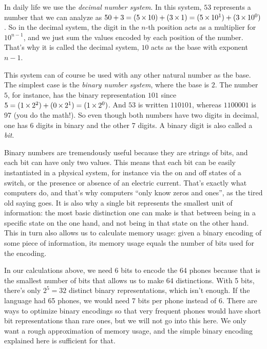 \begin{techinfo}
    In daily life we use the \emph{decimal number system}.
    In this system, $53$ represents a number that we can analyze as $50 + 3 = (5 \mathop{\times} 10) + (3 \mathop{\times} 1) = (5 \mathop{\times} 10^1) + (3 \mathop{\times} 10^0)$.
    So in the decimal system, the digit in the $n$-th position acts as a multiplier for $10^{n-1}$, and we just sum the values encoded by each position of the number.
    That's why it is called the decimal system, $10$ acts as the base with exponent $n-1$.

    This system can of course be used with any other natural number as the base.
    The simplest case is the \emph{binary number system}, where the base is $2$.
    The number $5$, for instance, has the binary representation $101$ since $5 = (1 \mathop{\times} 2^2) + (0 \mathop{\times} 2^1) = (1 \mathop{\times} 2^0)$.
    And $53$ is written $110101$, whereas $1100001$ is 97 (you do the math!).
    So even though both numbers have two digits in decimal, one has 6 digits in binary and the other 7 digits.
    A binary digit is also called a \emph{bit}.

    Binary numbers are tremendously useful because they are strings of bits, and each bit can have only two values.
    This means that each bit can be easily instantiated in a physical system, for instance via the on and off states of a switch, or the presence or absence of an electric current.
    That's exactly what computers do, and that's why computers ``only know zeros and ones'', as the tired old saying goes.
    It is also why a single bit represents the smallest unit of information: the most basic distinction one can make is that between being in a specific state on the one hand, and not being in that state on the other hand.
    This in turn also allows us to calculate memory usage: given a binary encoding of some piece of information, its memory usage equals the number of bits used for the encoding.

    In our calculations above, we need 6 bits to encode the 64 phones because that is the smallest number of bits that allows us to make 64 distinctions.
    With 5 bits, there's only $2^5 = 32$ distinct binary representations, which isn't enough.
    If the language had 65 phones, we would need 7 bits per phone instead of 6.
    There are ways to optimize binary encodings so that very frequent phones would have short bit representations than rare ones, but we will not go into this here.
    We only want a rough approximation of memory usage, and the simple binary encoding explained here is sufficient for that.
\end{techinfo}

